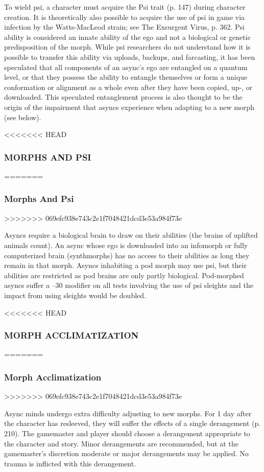 To wield psi, a character must acquire the Psi trait (p.
147) during character creation. It is theoretically also
possible to acquire the use of psi in game via infection
by the Watts-MacLeod strain; see The Exsurgent
Virus, p. 362.
Psi ability is considered an innate ability of the
ego and not a biological or genetic predisposition of
the morph. While psi researchers do not understand
how it is possible to transfer this ability via uploads,
backups, and farcasting, it has been speculated that
all components of an async’s ego are entangled on a
quantum level, or that they possess the ability to entangle
themselves or form a unique conformation or
alignment as a whole even after they have been copied,
up-, or downloaded. This speculated entanglement
process is also thought to be the origin of the impairment
that asyncs experience when adapting to a new
morph (see below).

<<<<<<< HEAD
\subsubsection{MORPHS AND PSI}
=======
\subsubsection{Morphs And Psi}
>>>>>>> 069efc938e743c2e1f7048421dcd3e53a984f73e

Asyncs require a biological brain to draw on their
abilities (the brains of uplifted animals count). An
async whose ego is downloaded into an infomorph or
fully computerized brain (synthmorphs) has no access
to their abilities as long they remain in that morph.
Asyncs inhabiting a pod morph may use psi, but
their abilities are restricted as pod brains are only
partly biological. Pod-morphed asyncs suffer a –30
modifier on all tests involving the use of psi sleights
and the impact from using sleights would be doubled.

<<<<<<< HEAD
\subsubsection{MORPH ACCLIMATIZATION}
=======
\subsubsection{Morph Acclimatization}
>>>>>>> 069efc938e743c2e1f7048421dcd3e53a984f73e

Async minds undergo extra difficulty adjusting to new
morphs. For 1 day after the character has resleeved,
they will suffer the effects of a single derangement
(p. 210). The gamemaster and player should choose a
derangement appropriate to the character and story.
Minor derangements are recommended, but at the
gamemaster’s discretion moderate or major derangements
may be applied. No trauma is inflicted with
this derangement.

